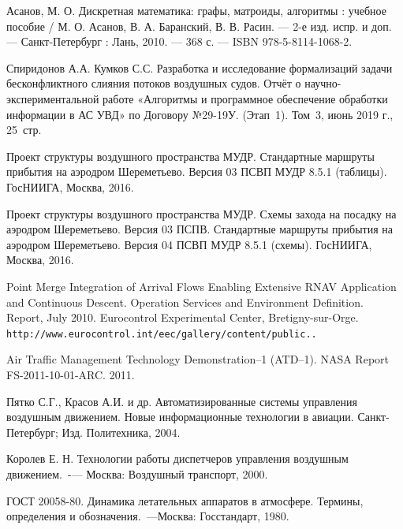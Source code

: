 \documentclass[12pt, a4 paper]{article}
\theoremstyle{plain}
\begin{document}
\begin{thebibliography}{9}

 Асанов, М. О. Дискретная математика: графы, матроиды, алгоритмы : учебное пособие / М. О. Асанов, В. А. Баранский, В. В. Расин. — 2-е изд. испр. и доп. — Санкт-Петербург : Лань, 2010. — 368 с. — ISBN 978-5-8114-1068-2. 

 Спиридонов А.А. Кумков С.С. Разработка и исследование формализаций задачи бесконфликтного слияния потоков воздушных судов. Отчёт о научно-экспериментальной работе «Алгоритмы и программное обеспечение обработки информации в АС УВД» по Договору №29-19У. (Этап~1). Том~3, июнь 2019 г., 25~стр.
 
 Проект структуры воздушного пространства МУДР. Стандартные маршруты прибытия на аэродром Шереметьево. Версия 03 ПСВП МУДР 8.5.1 (таблицы). ГосНИИГА, Москва, 2016.

 Проект структуры воздушного пространства МУДР. Схемы захода на посадку на аэродром Шереметьево. Версия 03 ПСПВ. Стандартные маршруты прибытия на аэродром Шереметьево. Версия 04 ПСВП МУДР 8.5.1 (схемы). ГосНИИГА, Москва, 2016.

 Point Merge Integration of Arrival Flows Enabling Extensive RNAV Application and Continuous Descent. Operation Services and Environment Definition. Report, July 2010. Eurocontrol Experimental Center, Bretigny-sur-Orge.\\
\texttt{http://www.eurocontrol.int/eec/gallery/content/public..}

 Air Traffic Management Technology Demonstration--1 (ATD--1). NASA Report FS-2011-10-01-ARC. 2011.

 Пятко С.Г., Красов А.И. и др. Автоматизированные системы управления воздушным движением. Новые информационные технологии в авиации. Санкт-Петербург; Изд. Политехника, 2004.

 Королев Е. Н. Технологии работы диспетчеров управления воздушным движением.~-— Москва: Воздушный транспорт, 2000.

 ГОСТ 20058-80. Динамика летательных аппаратов в атмосфере. Термины, определения и обозначения.~---Москва: Госстандарт, 1980.


\end{thebibliography}
\end{document}
